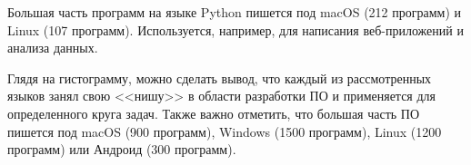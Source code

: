 Большая часть программ на языке Python пишется под macOS (212 программ) и Linux (107 программ). Используется, например, для написания веб-приложений и анализа данных.

Глядя на гистограмму, можно сделать вывод, что каждый из рассмотренных языков занял свою <<нишу>> в области разработки ПО и применяется для определенного круга задач. Также важно отметить, что большая часть ПО пишется под macOS (900 программ), Windows (1500 программ), Linux (1200 программ) или Андроид (300 программ).